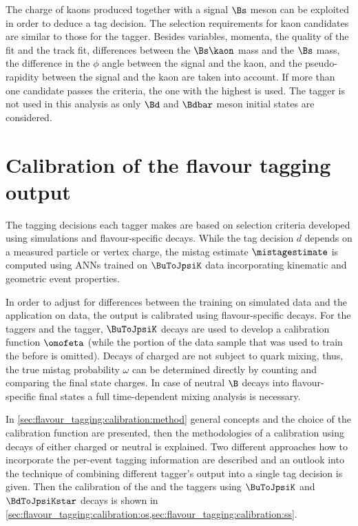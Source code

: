 The charge of kaons produced together with a signal $\Bs$ meson can be exploited
in order to deduce a tag decision. The selection requirements for kaon
candidates are similar to those for the \SSpi tagger. Besides \PID variables,
momenta, the quality of the \IP fit and the track fit, differences between the
$\Bs\kaon$ mass and the $\Bs$ mass, the difference in the $\phi$ angle between
the signal \Bmeson and the kaon, and the pseudo-rapidity between the signal
\Bmeson and the kaon are taken into account. If more than one candidate passes
the criteria, the one with the highest \pT is used. The \SSK tagger is not used
in this analysis as only $\Bd$ and $\Bdbar$ meson initial states are considered.

\section{Calibration of the flavour tagging output}
\label{sec:flavour_tagging:calibration}

The tagging decisions each tagger makes are based on selection criteria
developed using simulations and flavour-specific decays. While the tag decision
$d$ depends on a measured particle or vertex charge, the mistag estimate
$\mistagestimate$ is computed using \acp{ANN} trained on \sweighted $\BuToJpsiK$
data incorporating kinematic and geometric event properties.

In order to adjust for differences between the training on simulated data and
the application on data, the \ANN output is calibrated using flavour-specific
decays. For the \OS taggers and the \SSpi tagger, $\BuToJpsiK$ decays are used
to develop a calibration function $\omofeta$ (while the portion of the data
sample that was used to train the \ANN before is omitted). Decays of charged
\Bmesons are not subject to quark mixing, thus, the true mistag probability
$\omega$ can be determined directly by counting and comparing the final state
charges. In case of neutral $\B$ decays into flavour-specific final states a
full time-dependent mixing analysis is necessary.

In \cref{sec:flavour_tagging:calibration:method} general concepts and the choice
of the calibration function are presented, then the methodologies of a
calibration using decays of either charged or neutral \Bmesons is explained. Two
different approaches how to incorporate the per-event tagging information are
described and an outlook into the technique of combining different tagger's
output into a single tag decision is given. Then the calibration of the \OS and
the \SSpi taggers using $\BuToJpsiK$ and $\BdToJpsiKstar$ decays is shown in
\cref{sec:flavour_tagging:calibration:os,sec:flavour_tagging:calibration:ss}.

